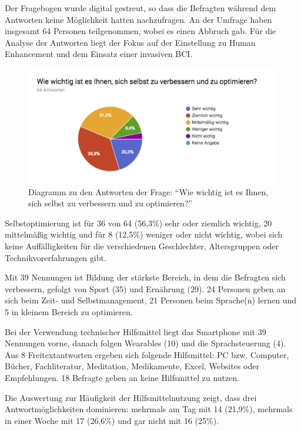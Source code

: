 \documentclass[11pt,ngerman,parskip=half]{scrartcl}
\begin{document}
Der Fragebogen wurde digital gestreut, so dass die Befragten während dem
Antworten keine Möglichkeit hatten nachzufragen. An der Umfrage haben
insgesamt 64 Personen teilgenommen, wobei es einen Abbruch gab. Für die
Analyse der Antworten liegt der Fokus auf der Einstellung zu Human
Enhancement und dem Einsatz einer invasiven BCI.

\begin{figure}[H]
  \centering
  \includegraphics[width=1.0\textwidth]{src/img/kathrin1.png}
  \caption{Diagramm zu den Antworten der Frage: \enquote{Wie wichtig ist es
  Ihnen, sich selbst zu verbessern und zu optimieren?}}
  \label{img:kathrin1}
\end{figure}

Selbstoptimierung ist für 36 von 64 (56,3\%) sehr oder ziemlich wichtig, 20
mittelmäßig wichtig und für 8 (12,5\%) weniger oder nicht wichtig, wobei sich
keine Auffälligkeiten für die verschiedenen Geschlechter, Altersgruppen oder
Technikvorerfahrungen gibt.

Mit 39 Nennungen ist Bildung der stärkste Bereich, in dem die Befragten sich
verbessern, gefolgt von Sport (35) und Ernährung (29). 24 Personen geben an
sich beim Zeit- und Selbstmanagement, 21 Personen beim Sprache(n) lernen und
5 in kleinem Bereich zu optimieren.

Bei der Verwendung technischer Hilfsmittel liegt das Smartphone mit 39
Nennungen vorne, danach folgen Wearables (10) und die Sprachsteuerung (4).
Aus 8 Freitextantworten ergeben sich folgende Hilfsmittel: PC bzw. Computer,
Bücher, Fachliteratur, Meditation, Medikamente, Excel, Websites oder
Empfehlungen. 18 Befragte geben an keine Hilfsmittel zu nutzen.

Die Auswertung zur Häufigkeit der Hilfsmittelnutzung zeigt, dass drei
Antwortmöglichkeiten dominieren: mehrmals am Tag mit 14 (21,9\%), mehrmals in
einer Woche mit 17 (26,6\%) und gar nicht mit 16 (25\%).
\end{document}
